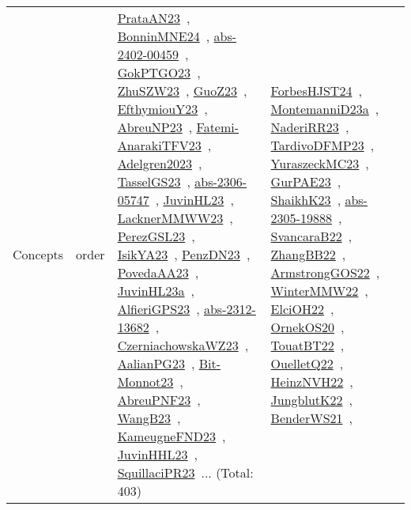 {\begin{longtable}{lp{3cm}>{\raggedright\arraybackslash}p{6cm}>{\raggedright\arraybackslash}p{6cm}>{\raggedright\arraybackslash}p{8cm}}
Concepts & order & \href{../works/PrataAN23.pdf}{PrataAN23}~\cite{PrataAN23}, \href{../works/BonninMNE24.pdf}{BonninMNE24}~\cite{BonninMNE24}, \href{../works/abs-2402-00459.pdf}{abs-2402-00459}~\cite{abs-2402-00459}, \href{../works/GokPTGO23.pdf}{GokPTGO23}~\cite{GokPTGO23}, \href{../works/ZhuSZW23.pdf}{ZhuSZW23}~\cite{ZhuSZW23}, \href{../works/GuoZ23.pdf}{GuoZ23}~\cite{GuoZ23}, \href{../works/EfthymiouY23.pdf}{EfthymiouY23}~\cite{EfthymiouY23}, \href{../works/AbreuNP23.pdf}{AbreuNP23}~\cite{AbreuNP23}, \href{../works/Fatemi-AnarakiTFV23.pdf}{Fatemi-AnarakiTFV23}~\cite{Fatemi-AnarakiTFV23}, \href{../works/Adelgren2023.pdf}{Adelgren2023}~\cite{Adelgren2023}, \href{../works/TasselGS23.pdf}{TasselGS23}~\cite{TasselGS23}, \href{../works/abs-2306-05747.pdf}{abs-2306-05747}~\cite{abs-2306-05747}, \href{../works/JuvinHL23.pdf}{JuvinHL23}~\cite{JuvinHL23}, \href{../works/LacknerMMWW23.pdf}{LacknerMMWW23}~\cite{LacknerMMWW23}, \href{../works/PerezGSL23.pdf}{PerezGSL23}~\cite{PerezGSL23}, \href{../works/IsikYA23.pdf}{IsikYA23}~\cite{IsikYA23}, \href{../works/PenzDN23.pdf}{PenzDN23}~\cite{PenzDN23}, \href{../works/PovedaAA23.pdf}{PovedaAA23}~\cite{PovedaAA23}, \href{../works/JuvinHL23a.pdf}{JuvinHL23a}~\cite{JuvinHL23a}, \href{../works/AlfieriGPS23.pdf}{AlfieriGPS23}~\cite{AlfieriGPS23}, \href{../works/abs-2312-13682.pdf}{abs-2312-13682}~\cite{abs-2312-13682}, \href{../works/CzerniachowskaWZ23.pdf}{CzerniachowskaWZ23}~\cite{CzerniachowskaWZ23}, \href{../works/AalianPG23.pdf}{AalianPG23}~\cite{AalianPG23}, \href{../works/Bit-Monnot23.pdf}{Bit-Monnot23}~\cite{Bit-Monnot23}, \href{../works/AbreuPNF23.pdf}{AbreuPNF23}~\cite{AbreuPNF23}, \href{../works/WangB23.pdf}{WangB23}~\cite{WangB23}, \href{../works/KameugneFND23.pdf}{KameugneFND23}~\cite{KameugneFND23}, \href{../works/JuvinHHL23.pdf}{JuvinHHL23}~\cite{JuvinHHL23}, \href{../works/SquillaciPR23.pdf}{SquillaciPR23}~\cite{SquillaciPR23}... (Total: 403) & \href{../works/ForbesHJST24.pdf}{ForbesHJST24}~\cite{ForbesHJST24}, \href{../works/MontemanniD23a.pdf}{MontemanniD23a}~\cite{MontemanniD23a}, \href{../works/NaderiRR23.pdf}{NaderiRR23}~\cite{NaderiRR23}, \href{../works/TardivoDFMP23.pdf}{TardivoDFMP23}~\cite{TardivoDFMP23}, \href{../works/YuraszeckMC23.pdf}{YuraszeckMC23}~\cite{YuraszeckMC23}, \href{../works/GurPAE23.pdf}{GurPAE23}~\cite{GurPAE23}, \href{../works/ShaikhK23.pdf}{ShaikhK23}~\cite{ShaikhK23}, \href{../works/abs-2305-19888.pdf}{abs-2305-19888}~\cite{abs-2305-19888}, \href{../works/SvancaraB22.pdf}{SvancaraB22}~\cite{SvancaraB22}, \href{../works/ZhangBB22.pdf}{ZhangBB22}~\cite{ZhangBB22}, \href{../works/ArmstrongGOS22.pdf}{ArmstrongGOS22}~\cite{ArmstrongGOS22}, \href{../works/WinterMMW22.pdf}{WinterMMW22}~\cite{WinterMMW22}, \href{../works/ElciOH22.pdf}{ElciOH22}~\cite{ElciOH22}, \href{../works/OrnekOS20.pdf}{OrnekOS20}~\cite{OrnekOS20}, \href{../works/TouatBT22.pdf}{TouatBT22}~\cite{TouatBT22}, \href{../works/OuelletQ22.pdf}{OuelletQ22}~\cite{OuelletQ22}, \href{../works/HeinzNVH22.pdf}{HeinzNVH22}~\cite{HeinzNVH22}, \href{../works/JungblutK22.pdf}{JungblutK22}~\cite{JungblutK22}, \href{../works/BenderWS21.pdf}{BenderWS21}~\cite{BenderWS21}, 
\end{longtable}}
